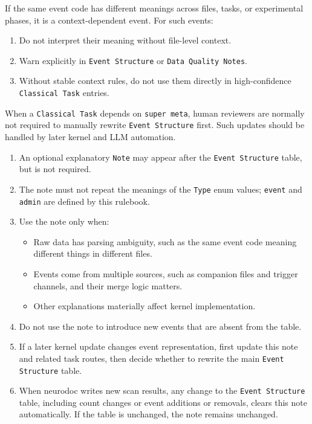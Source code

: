 \begin{tcolorbox}
\noindent If the same event code has different meanings across files, tasks, or experimental phases, it is a context-dependent event. For such events:\par\smallskip

\begin{enumerate}[leftmargin=1.5em,noitemsep,topsep=2pt]
\item Do not interpret their meaning without file-level context.
\item Warn explicitly in \texttt{Event Structure} or \texttt{Data Quality Notes}.
\item Without stable context rules, do not use them directly in high-confidence \texttt{Classical Task} entries.
\end{enumerate}

\smallskip{}\par\smallskip

\noindent When a \texttt{Classical Task} depends on \texttt{super meta}, human reviewers are normally not required to manually rewrite \texttt{Event Structure} first. Such updates should be handled by later kernel and LLM automation.\par\smallskip

\smallskip{}\par\smallskip

\begin{enumerate}[leftmargin=1.5em,noitemsep,topsep=2pt]
\item An optional explanatory \texttt{Note} may appear after the \texttt{Event Structure} table, but is not required.
\item The note must not repeat the meanings of the \texttt{Type} enum values; \texttt{event} and \texttt{admin} are defined by this rulebook.
\item Use the note only when:
\begin{itemize}[leftmargin=1.2em,noitemsep,topsep=1pt]
\item Raw data has parsing ambiguity, such as the same event code meaning different things in different files.
\item Events come from multiple sources, such as companion files and trigger channels, and their merge logic matters.
\item Other explanations materially affect kernel implementation.
\end{itemize}
\item Do not use the note to introduce new events that are absent from the table.
\item If a later kernel update changes event representation, first update this note and related task routes, then decide whether to rewrite the main \texttt{Event Structure} table.
\item When neurodoc writes new scan results, any change to the \texttt{Event Structure} table, including count changes or event additions or removals, clears this note automatically. If the table is unchanged, the note remains unchanged.
\end{enumerate}


\end{tcolorbox}
